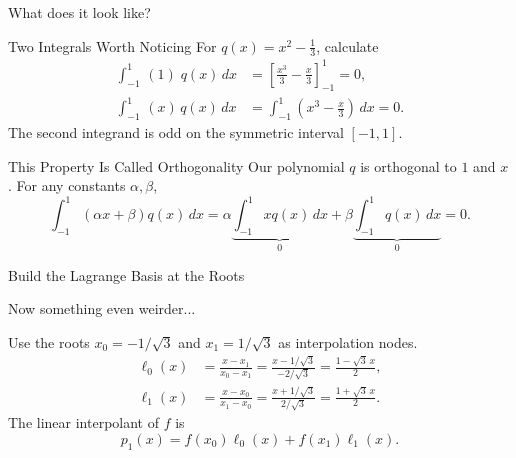 \documentclass[10pt]{beamer}
\begin{document}
\begin{frame}{What does it look like?}
\begin{center}
    
\end{center}

\end{frame}
\begin{frame}{Two Integrals Worth Noticing}
For $q(x)=x^2-\frac13$, calculate
\begin{align*}
    \int_{-1}^1\,(1)\; q(x)\,dx
    &=\left[\frac{x^3}{3}-\frac{x}{3}\right]_{-1}^{1}=0,\\[3mm]
    \int_{-1}^1 \,(x)\,q(x)\,dx
    &=\int_{-1}^1\left(x^3-\frac{x}{3}\right)\,dx=0.
\end{align*}
The second integrand is odd on the symmetric interval $[-1,1]$.
\end{frame}

\begin{frame}{This Property Is Called Orthogonality}
Our polynomial $q$ is orthogonal to $1$ and $x$. For any constants
$\alpha,\beta$,
\[
    \int_{-1}^1(\alpha x+\beta)q(x)\,dx
    =\alpha\underbrace{\int_{-1}^1 xq(x)\,dx}_{0}
    +\beta\underbrace{\int_{-1}^1 q(x)\,dx}_{0}=0.
\]
\end{frame}

\begin{frame}{Build the Lagrange Basis at the Roots}

\begin{alertblock}{}
    Now something even weirder...
\end{alertblock}
\vfill
Use the roots $x_0=-1/\sqrt3$ and $x_1=1/\sqrt3$ as interpolation nodes.
\begin{align*}
    \ell_0(x)&=\frac{x-x_1}{x_0-x_1}
    =\frac{x-1/\sqrt3}{-2/\sqrt3}
    =\frac{1-\sqrt3\,x}{2},\\[3mm]
    \ell_1(x)&=\frac{x-x_0}{x_1-x_0}
    =\frac{x+1/\sqrt3}{2/\sqrt3}
    =\frac{1+\sqrt3\,x}{2}.
\end{align*}
The linear interpolant of $f$ is
\[
    p_1(x)=f(x_0)\ell_0(x)+f(x_1)\ell_1(x).
\]
\end{frame}
\end{document}

